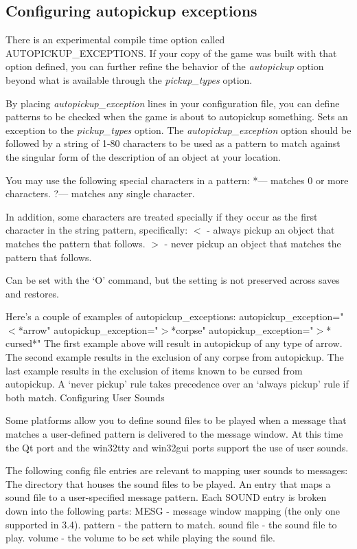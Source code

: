 \subsection{Configuring autopickup exceptions}

There is an experimental compile time option called AUTOPICKUP\_EXCEPTIONS.  
If your copy of the game was built with that option defined, you can 
further refine the behavior of the
{\it autopickup }
option beyond what is available through the 
{\it pickup\_types }
option. 

By placing 
{\it autopickup\_exception }
lines in your configuration
file, you can define patterns to be checked when the game is about to
autopickup something.
Sets an exception to the 
{\it pickup\_types }
option.
The
{\it autopickup\_exception }
option should be followed by a string of 1-80 characters to be used as a 
pattern to match against the singular form of the description of an 
object at your location.

You may use the following special characters in a pattern:
  *--- matches 0 or more characters.
  ?--- matches any single character.

In addition, some characters are treated specially if they occur as the first 
character in the string pattern, specifically:
$<$ - always pickup an object that matches the pattern that follows.
$>$ - never pickup an object that matches the pattern that follows.

Can be set with the `O' command, but the setting is not preserved
across saves and restores.

Here's a couple of examples of autopickup\_exceptions:
autopickup\_exception="$<$*arrow"
autopickup\_exception="$>$*corpse"
autopickup\_exception="$>$* cursed*"
The first example above will result in autopickup of any type of arrow.
The second example results in the exclusion of any corpse from autopickup.
The last example results in the exclusion of items known to be cursed from autopickup.
A `never pickup' rule takes precedence over an `always pickup' rule if both match.
Configuring User Sounds

Some platforms allow you to define sound files to be played when a message 
that matches a user-defined pattern is delivered to the message window.
At this time the Qt port and the win32tty and win32gui ports support the
use of user sounds.

The following config file entries are relevant to mapping user sounds
to messages:
The directory that houses the sound files to be played.
An entry that maps a sound file to a user-specified message pattern.
Each SOUND entry is broken down into the following parts:
MESG       - message window mapping (the only one supported in 3.4).
pattern    - the pattern to match.
sound file - the sound file to play.
volume     - the volume to be set while playing the sound file.

